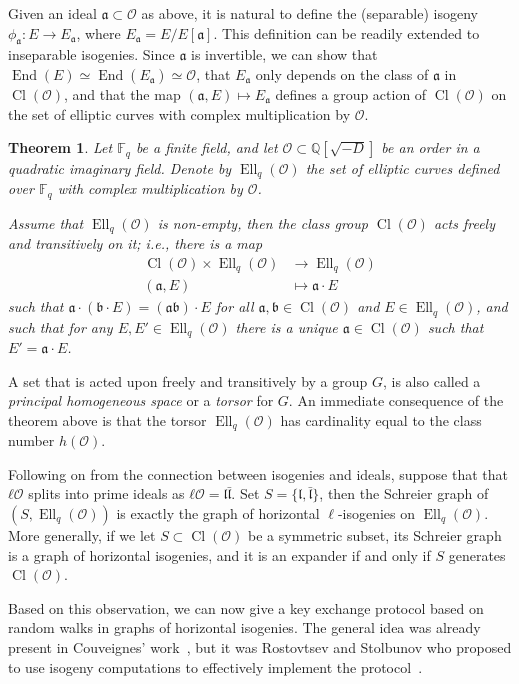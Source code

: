 \documentclass[10pt]{article}
\theoremstyle{plain}
\newtheorem{theorem}{Theorem}
\theoremstyle{definition}
\DeclareMathOperator{\End}{End} %
\DeclareMathOperator{\Cl}{Cl}
\DeclareMathOperator{\Ell}{Ell}
\def\F{\ensuremath{\mathbb{F}}}
\def\O{\ensuremath{\mathcal{O}}}
\def\a{\ensuremath{\mathfrak{a}}}
\begin{document}
Given an ideal $\a⊂\O$ as above, it is natural to define the
(separable) isogeny $ϕ_{\a}:E\to E_{\a}$, where $E_{\a}=E/E[\a]$. %
This definition can be readily extended to inseparable isogenies. %
Since $\a$ is invertible, we can show that $\End(E)≃\End(E_\a)≃\O$,
that $E_\a$ only depends on the class of $\a$ in $\Cl(\O)$, and that
the map $(\a,E)\mapsto E_\a$ defines a group action of $\Cl(\O)$ on
the set of elliptic curves with complex multiplication by $\O$.

\begin{theorem}
  Let $\F_q$ be a finite field, and let $\O⊂ℚ[\sqrt{-D}]$ be an order
  in a quadratic imaginary field. %
  Denote by $\Ell_q(\O)$ the set of elliptic curves defined over
  $\F_q$ with complex multiplication by $\O$.

  Assume that $\Ell_q(\O)$ is non-empty, then the class group
  $\Cl(\O)$ acts \emph{freely} and \emph{transitively} on it; i.e.,
  there is a map
  \begin{align*}
    \Cl(\O)×\Ell_q(\O) &\to \Ell_q(\O)\\
    (\a,E) &\mapsto \a·E
  \end{align*}
  such that $\a·(\mathfrak{b}·E)=(\a\mathfrak{b})·E$ for all
  $\a,\mathfrak{b}∈\Cl(\O)$ and $E∈\Ell_q(\O)$, and such that for any
  $E,E'∈\Ell_q(\O)$ there is a unique $\a∈\Cl(\O)$ such that
  $E'=\a·E$. %
\end{theorem}

A set that is acted upon freely and transitively by a group $G$, is
also called a \emph{principal homogeneous space} or a \emph{torsor}
for $G$. %
An immediate consequence of the theorem above is that the torsor
$\Ell_q(\O)$ has cardinality equal to the class number $h(\O)$. %

Following on from the connection between isogenies and ideals, suppose
that that $ℓ\O$ splits into prime ideals as
$ℓ\O=\mathfrak{l}\bar{\mathfrak{l}}$. %
Set $S=\{\mathfrak{l},\bar{\mathfrak{l}}\}$, then the Schreier graph
of $(S, \Ell_q(\O))$ is exactly the graph of horizontal
$\ell$-isogenies on $\Ell_q(\O)$. %
More generally, if we let $S⊂\Cl(\O)$ be a symmetric subset, its
Schreier graph is a graph of horizontal isogenies, and it is an
expander if and only if $S$ generates $\Cl(\O)$.

Based on this observation, we can now give a key exchange protocol
based on random walks in graphs of horizontal isogenies. %
The general idea was already present in Couveignes' work~\cite{Couv},
but it was Rostovtsev and Stolbunov who proposed to use isogeny
computations to effectively implement the protocol~\cite{R&S,Stol}. %
\end{document}
